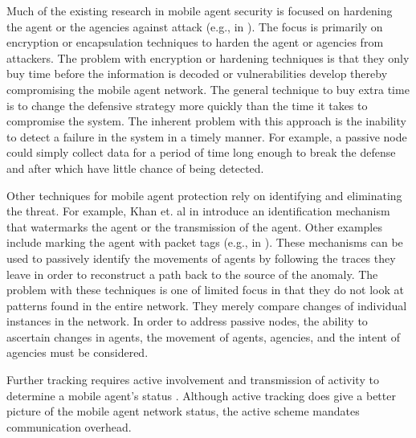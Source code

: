 \documentclass{acm_proc_article-sp}
\begin{document}
Much of the existing research in mobile agent security is focused on hardening the agent or the agencies against attack (e.g., in \cite{lin10}).  The focus is primarily on encryption or encapsulation techniques to harden the agent or agencies from attackers.  The problem with encryption or hardening techniques is that they only buy time before the information is decoded or vulnerabilities develop thereby compromising the mobile agent network.  The general technique to buy extra time is to change the defensive strategy more quickly than the time it takes to compromise the system.  The inherent problem with this approach is the inability to detect a failure in the system in a timely manner.  For example, a passive node could simply collect data for a period of time long enough to break the defense and after which have little chance of being detected.

Other techniques for mobile agent protection rely on identifying and eliminating the threat.  For example, Khan et. al in \cite{khan08} introduce an identification mechanism that watermarks the agent or the transmission of the agent.  Other examples include marking the agent with packet tags (e.g., in \cite{duwairi04, goodrich02, peng07}).  These mechanisms can be used to passively identify the movements of agents by following the traces they leave in order to reconstruct a path back to the source of the anomaly.  The problem with these techniques is one of limited focus in that they do not look at patterns found in the entire network.  They merely compare changes of individual instances in the network.  In order to address passive nodes, the ability to ascertain changes in agents, the movement of agents, agencies, and the intent of agencies must be considered.

Further tracking requires active involvement and transmission of activity to determine a mobile agent's status \cite{sreedevi09}.  Although active tracking does give a better picture of the mobile agent network status, the active scheme mandates communication overhead.
\end{document}
